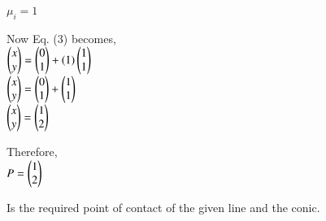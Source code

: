 \documentclass[journal,12pt,twocolumn]{IEEEtran}
\begin{document}
\vspace{0.25cm}
$ \mu_i = 1$\\ 
\vspace{0.4cm}
\raggedright
Now Eq. (3) becomes,\\
\vspace{0.25cm}
\centering
$ \begin{pmatrix}x \\ y\end{pmatrix} = \begin{pmatrix}0\\1\end{pmatrix} + (1)  \begin{pmatrix}1 \\ 1\end{pmatrix} $ \\
\vspace{0.25cm}
$ \begin{pmatrix}x \\y \end{pmatrix} = \begin{pmatrix}0\\1\end{pmatrix} + \begin{pmatrix}1\\1\end{pmatrix} $ \\
\vspace{0.25cm}
$ \begin{pmatrix}x \\y \end{pmatrix} = \begin{pmatrix}1\\2\end{pmatrix} $ \\

\raggedright
Therefore,\\

\centering
$ P = \begin{pmatrix}1\\2\end{pmatrix}$ \\

\raggedright
Is the required point of contact of the given line and the conic.
\end{document}
